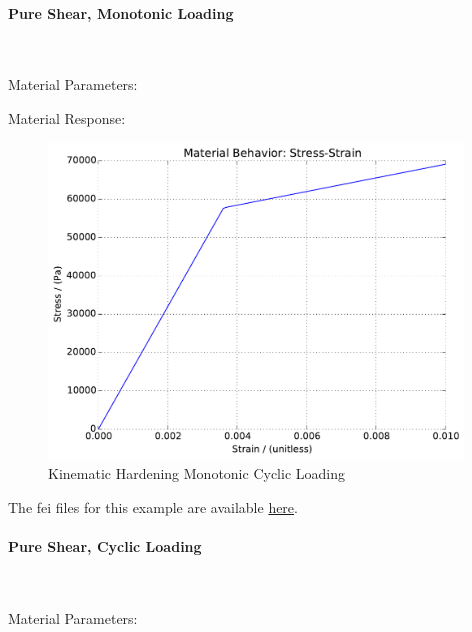 \documentclass[fleqn,11pt]{article}
\begin{document}
\paragraph{Pure Shear, Monotonic Loading} ~

Material Parameters:


Material Response:
\begin{figure}[H]
\begin{center}
\includegraphics[width=11cm]{../fei_examples/elastoplastic_kinematic_hardening/1pure_shear_mono_loading/result.pdf}
\caption{
\label{Kinematic Hardening Monotonic Cyclic Loading}
Kinematic Hardening Monotonic Cyclic Loading}
\end{center}
\end{figure}

The fei files for this example are available \href{https://github.com/yuan-energy/education_examples/tree/master/fei_examples/kinematic_hardening_pure_shear_solid/1pure_shear_mono_loading}{here}.

\newpage
\paragraph{Pure Shear, Cyclic Loading} ~

Material Parameters:

\end{document}
